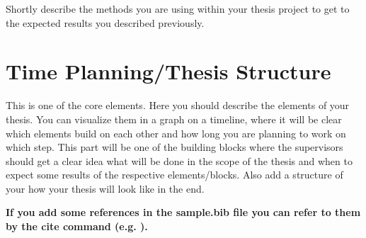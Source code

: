 \documentclass[11pt]{article}
\begin{document}
Shortly describe the methods you are using within your thesis project to get to the expected results you described previously.

\section{Time Planning/Thesis Structure}

This is one of the core elements. Here you should describe the elements of your thesis. You can visualize them in a graph on a timeline, where it will be clear which elements build on each other and how long you are planning to work on which step. This part will be one of the building blocks where the supervisors should get a clear idea what will be done in the scope of the thesis and when to expect some results of the respective elements/blocks. Also add a structure of your how your thesis will look like in the end.




\textbf{If you add some references in the sample.bib file you can refer to them by the cite command (e.g. \cite{moore2008defining}).}

\printbibliography
\end{document}
